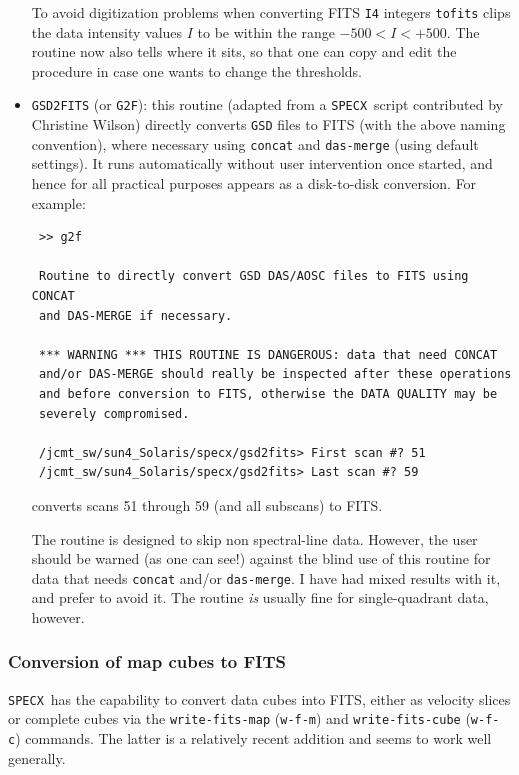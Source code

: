 \documentclass[11pt,twoside]{article}
\newcommand{\SPECX}{{\tt SPECX}}
\begin{document}
\begin{itemize}
To avoid digitization problems when converting FITS {\tt I4} integers
{\tt tofits} clips the data intensity values $I$ to be within the
range $-500 < I < +500$. The routine now also tells where it sits, so
that one can copy and edit the procedure in case one wants to change
the thresholds.

\item
{\tt GSD2FITS} (or {\tt G2F}): this routine (adapted from a \SPECX\
script contributed by Christine Wilson) directly converts {\tt GSD}
files to FITS (with the above naming convention), where necessary
using {\tt concat} and {\tt das-merge} (using default settings). It
runs automatically without user intervention once started, and hence
for all practical purposes appears as a disk-to-disk conversion.  For
example:

\begin{verbatim}
 >> g2f 
 
 Routine to directly convert GSD DAS/AOSC files to FITS using CONCAT
 and DAS-MERGE if necessary.
 
 *** WARNING *** THIS ROUTINE IS DANGEROUS: data that need CONCAT
 and/or DAS-MERGE should really be inspected after these operations
 and before conversion to FITS, otherwise the DATA QUALITY may be
 severely compromised.
 
 /jcmt_sw/sun4_Solaris/specx/gsd2fits> First scan #? 51
 /jcmt_sw/sun4_Solaris/specx/gsd2fits> Last scan #? 59

\end{verbatim}

converts scans 51 through 59 (and all subscans) to FITS.

The routine is designed to skip non spectral-line data. However, the
user should be warned (as one can see!) against the blind use of this
routine for data that needs {\tt concat} and/or {\tt das-merge}. I
have had mixed results with it, and prefer to avoid it. The
routine {\it is} usually fine for single-quadrant data, however.
\end{itemize}

\subsubsection{Conversion of map cubes to FITS}
\label{sec:specxmaps2fits}
\SPECX\ has the capability to convert data cubes into FITS, either as
velocity slices or complete cubes via the {\tt write-fits-map}
({\tt{w-f-m}}) and {\tt write-fits-cube} ({\tt{w-f-c}}) commands. The
latter is a relatively recent addition and seems to work well
generally.
\end{document}
